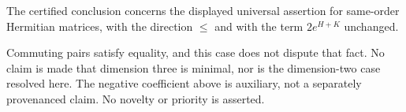 \begin{cxrefutation}
\begin{remark}[Scope]
The certified conclusion concerns the displayed universal assertion for
same-order Hermitian matrices, with the direction $\leq$ and with the term
$2e^{H+K}$ unchanged.

Commuting pairs satisfy equality, and this case does not dispute that fact.
No claim is made that dimension three is minimal, nor is the dimension-two
case resolved here. The negative coefficient above is auxiliary, not a
separately provenanced claim. No novelty or priority is asserted.
\end{remark}
\end{cxrefutation}
